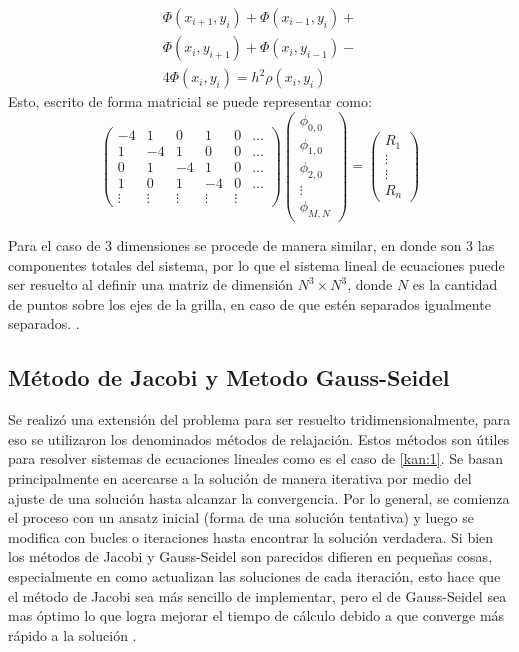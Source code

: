\documentclass[reprint,amsmath,amssymb,aps]{revtex4-2}
\begin{document}
\begin{equation}
\begin{split}
    \Phi(x_{i+1},y_i)  + \Phi(x_{i-1},y_i) +\\ \Phi(x_i,y_{i+1})  + \Phi(x_i,y_{i-1}) - \\ 4\Phi(x_i,y_i) =  h^2 \rho (x_i,y_i)
\end{split}
\end{equation}
Esto, escrito de forma matricial se puede representar como:
\begin{equation}\label{matriz}
\begin{pmatrix}
-4 & 1 & 0 & 1 & 0 & \dots \\ 
1 & -4 & 1 & 0 & 0 & \dots \\
0 & 1 & -4 & 1 & 0 & \dots \\
1 & 0 & 1 & -4 & 0 & \dots \\
\vdots & \vdots & \vdots & \vdots & \vdots & 
\end{pmatrix}
\begin{pmatrix}
\phi_{0,0}\\ \phi_{1,0} \\ \phi_{2,0} \\ \vdots \\ \phi_{M,N}
\end{pmatrix}=
\begin{pmatrix}
R_1 \\
\vdots\\
\vdots\\
R_n
\end{pmatrix}
\end{equation}

Para el caso de 3 dimensiones se procede de manera similar, en donde son 3 las componentes totales del sistema, por lo que el sistema lineal de ecuaciones puede ser resuelto al definir una matriz de dimensión $N^3 \times N^3$, donde $N$ es la cantidad de puntos sobre los ejes de la grilla, en caso de que estén separados igualmente separados. \cite{Seidel}.


\subsection{Método de Jacobi y Metodo Gauss-Seidel}

Se realizó una extensión del problema para ser resuelto tridimensionalmente, para eso se utilizaron los denominados métodos de relajación. Estos métodos son útiles para resolver sistemas de ecuaciones lineales como es el caso de \ref{kan:1}. Se basan principalmente en acercarse a la solución de manera iterativa por medio del ajuste de una solución hasta alcanzar la convergencia. Por lo general, se comienza el proceso con un ansatz inicial (forma de una solución tentativa) y luego se modifica con bucles o iteraciones hasta encontrar la solución verdadera.
Si bien los métodos de Jacobi y Gauss-Seidel son parecidos difieren en pequeñas cosas, especialmente en como actualizan las soluciones de cada iteración, esto hace que el método de Jacobi sea más sencillo de implementar, pero el de Gauss-Seidel sea mas óptimo lo que logra mejorar el tiempo de cálculo debido a que converge más rápido a la solución \cite{poissonGauss, jacobi}.
\end{document}
